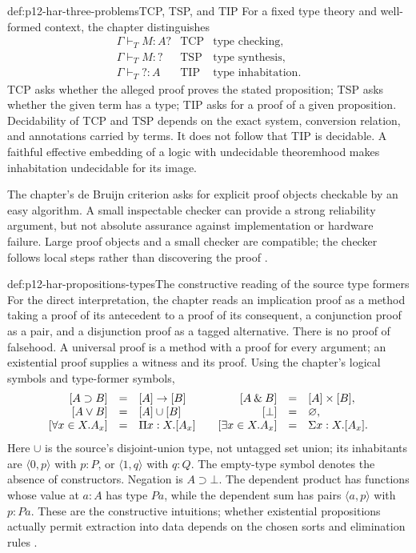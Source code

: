 \begin{hbdefinition}{def:p12-har-three-problems}{TCP, TSP, and TIP}
For a fixed type theory and well-formed context, the chapter distinguishes
\[
\begin{array}{lll}
 \Gamma\vdash_T M:A?&\mathrm{TCP}&\text{type checking},\\
 \Gamma\vdash_T M:?&\mathrm{TSP}&\text{type synthesis},\\
 \Gamma\vdash_T ?:A&\mathrm{TIP}&\text{type inhabitation}.
\end{array}
\]
TCP asks whether the alleged proof proves the stated proposition; TSP asks
whether the given term has a type; TIP asks for a proof of a given
proposition. Decidability of TCP and TSP depends on the exact system,
conversion relation, and annotations carried by terms. It does not follow
that TIP is decidable. A faithful effective embedding of a logic with
undecidable theoremhood makes inhabitation undecidable for its image.

The chapter's de Bruijn criterion asks for explicit proof objects checkable
by an easy algorithm. A small inspectable checker can provide a strong
reliability argument, but not absolute assurance against implementation or
hardware failure. Large proof objects and a small checker are compatible;
the checker follows local steps rather than discovering the proof
\cite[pp.~1154--1156]{BarendregtGeuvers2001}.
\end{hbdefinition}

\begin{hbdefinition}{def:p12-har-propositions-types}{The constructive reading of the source type formers}
For the direct interpretation, the chapter reads an implication proof as a
method taking a proof of its antecedent to a proof of its consequent, a
conjunction proof as a pair, and a disjunction proof as a tagged alternative.
There is no proof of falsehood. A universal proof is a method with a proof
for every argument; an existential proof supplies a witness and its proof.
Using the chapter's logical symbols and type-former symbols,
\[
\begin{array}{rcl@{\qquad}rcl}
 [A\supset B]&=&[A]\to[B]&[A\mathbin{\&}B]&=&[A]\times[B],\\
 {}[A\lor B]&=&[A]\cup[B]&[\bot]&=&\varnothing,\\
 {}[\forall x\in X.A_x]&=&\Pi x:X.[A_x]&
 [\exists x\in X.A_x]&=&\Sigma x:X.[A_x].
\end{array}
\]
Here \(\cup\) is the source's disjoint-union type, not untagged set union;
its inhabitants are \(\langle0,p\rangle\) with \(p:P\), or
\(\langle1,q\rangle\) with \(q:Q\). The empty-type symbol denotes
the absence of constructors. Negation is \(A\supset\bot\).
The dependent product has functions whose value at \(a:A\) has type
\(P a\), while the dependent sum has pairs \(\langle a,p\rangle\)
with \(p:P a\). These are the constructive intuitions; whether existential
propositions actually permit extraction into data depends on the chosen
sorts and elimination rules \cite[pp.~1156--1157]{BarendregtGeuvers2001}.
\end{hbdefinition}

